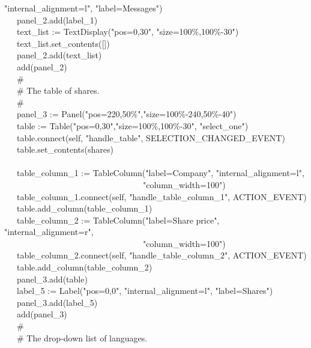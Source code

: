 {"internal\_alignment=l",
"label=Messages") \\
\>   \ \ \ panel\_2.add(label\_1) \\
\>   \ \ \ text\_list :=
TextDisplay("pos=0,30",
"size=100\%,100\%-30") \\
\>   \ \ \ text\_list.set\_contents([]) \\
\>   \ \ \ panel\_2.add(text\_list) \\
\>   \ \ \ add(panel\_2) \\
\>   \ \ \ \# \\
\>   \ \ \ \# The table of shares. \\
\>   \ \ \ \# \\
\>   \ \ \ panel\_3 :=
Panel("pos=220,50\%","size=100\%-240,50\%-40") \\
\>   \ \ \ table :=
Table("pos=0,30","size=100\%,100\%-30",
"select\_one") \\
\>   \ \ \ table.connect(self,
"handle\_table",
SELECTION\_CHANGED\_EVENT) \\
\>   \ \ \ table.set\_contents(shares) \\
\ \\
\>   \ \ \ table\_column\_1 :=
TableColumn("label=Company",
"internal\_alignment=l", \\
\>   \ \ \ \ \ \ \ \ \ \ \ \ \ \ \ \ \ \ \ \ \ \ \ \ \ \ \ \ \ \ \ \ \ "column\_width=100") \\
\>   \ \ \ table\_column\_1.connect(self,
"handle\_table\_column\_1", ACTION\_EVENT) \\
\>   \ \ \ table.add\_column(table\_column\_1) \\
\>   \ \ \ table\_column\_2 := TableColumn("label=Share
price",
"internal\_alignment=r", \\
\>   \ \ \ \ \ \ \ \ \ \ \ \ \ \ \ \ \ \ \ \ \ \ \ \ \ \ \ \ \ \ \ \ \ "column\_width=100") \\
\>   \ \ \ table\_column\_2.connect(self,
"handle\_table\_column\_2", ACTION\_EVENT) \\
\>   \ \ \ table.add\_column(table\_column\_2) \\
\>   \ \ \ panel\_3.add(table) \\
\>   \ \ \ label\_5 := Label("pos=0,0",
"internal\_alignment=l",
"label=Shares") \\
\>   \ \ \ panel\_3.add(label\_5) \\
\>   \ \ \ add(panel\_3) \\
\>   \ \ \ \# \\
\>   \ \ \ \# The drop-down list of languages. \\
}
